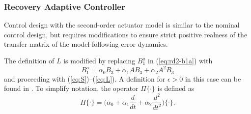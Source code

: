 \documentclass[english]{ifacconf}
\begin{document}
\subsubsection{Recovery Adaptive Controller}
Control design with the second-order actuator model is similar to the nominal control design, but requires modifications to ensure strict positive realness of the transfer matrix of the model-following error dynamics. 

The definition of $L$ is modified by replacing $B_1^a$ in (\ref{eq:rd2-b1a}) with
\begin{equation}
B_1^a = \alpha_0 B_3 + \alpha_1 A B_3 + \alpha_2 A^2 B_3 \label{eq:rd3-b1a}
\end{equation}
and proceeding with (\ref{eq:S})--(\ref{eq:L}). A definition for $\epsilon>0$ in this case can be found in \cite{qu2016phd}. To simplify notation, the operator $\Pi \{\cdot \}$ is defined as
\begin{equation}
\Pi \{ \cdot \} = \big( \alpha_0 + \alpha_1 \frac{d}{dt} + \alpha_2 \frac{d^2}{dt^2} \big) \{ \cdot \}.
\end{equation}
\end{document}
